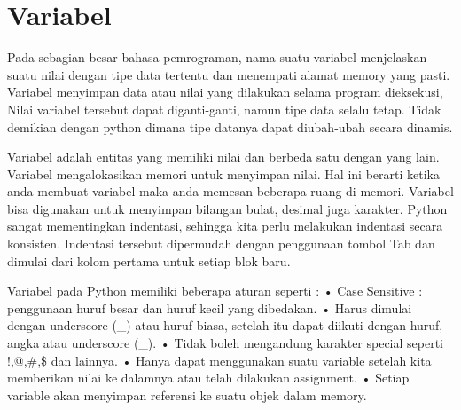 \section{Variabel}
Pada sebagian besar bahasa pemrograman, nama suatu variabel
menjelaskan suatu nilai dengan tipe data tertentu 
dan menempati alamat memory yang pasti.
Variabel menyimpan data atau nilai yang dilakukan selama program dieksekusi,
Nilai variabel tersebut dapat diganti-ganti, namun tipe data selalu tetap.
Tidak demikian dengan python dimana tipe datanya dapat diubah-ubah
secara dinamis\cite{suparno2013komputasi}.

Variabel adalah entitas yang memiliki nilai dan berbeda satu dengan yang lain. Variabel mengalokasikan memori untuk menyimpan nilai.
Hal ini berarti ketika anda membuat variabel maka anda memesan beberapa ruang di memori. 
Variabel bisa digunakan untuk menyimpan bilangan bulat, desimal juga karakter.
Python sangat mementingkan indentasi, sehingga kita perlu melakukan indentasi secara konsisten. 
Indentasi tersebut dipermudah dengan penggunaan tombol Tab dan dimulai dari kolom pertama untuk setiap blok baru. \cite{santoso2009bahasa}

Variabel pada Python memiliki beberapa aturan seperti :
•	Case Sensitive : penggunaan huruf besar dan huruf kecil yang dibedakan.
•	Harus dimulai dengan underscore (_) atau huruf biasa, setelah itu dapat diikuti dengan huruf, angka atau underscore (_).
•	Tidak boleh mengandung karakter special seperti !,@,\#,\$ dan lainnya.
•	Hanya dapat menggunakan suatu variable setelah kita memberikan nilai ke dalamnya atau telah dilakukan assignment.
•	Setiap variable akan menyimpan referensi ke suatu objek dalam memory.\cite{santoso2009bahasa}
